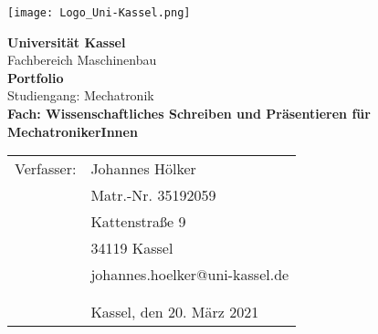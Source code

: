 \texttt{[image: Logo\_Uni-Kassel.png]}\vspace{50pt}
\begin{center}
\textbf{Universität Kassel}\\
Fachbereich Maschinenbau\\\vspace{50pt}
\textbf{Portfolio}\\
Studiengang: Mechatronik\\\vspace{20pt}
\textbf{Fach: Wissenschaftliches Schreiben und Präsentieren für MechatronikerInnen}\\\vspace{50pt}

\begin{tabular}{rl}
Verfasser: & Johannes Hölker\\
 & Matr.-Nr. 35192059\\
 & Kattenstraße 9\\
 & 34119 Kassel\\
 & johannes.hoelker@uni-kassel.de\\\vspace{40pt}
 & \\
 & \\
 & Kassel, den 20. März 2021\\
\end{tabular}
\end{center}
